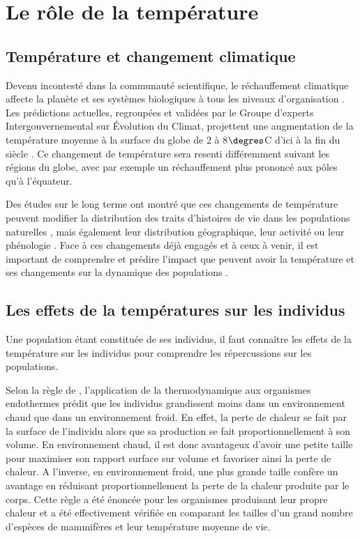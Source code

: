 \section{Le rôle de la température}

\subsection{Température et changement climatique}

Devenu incontesté dans la communauté scientifique, le réchauffement climatique
affecte la planète et ses systèmes biologiques à tous les niveaux
d'organisation \autocites{sagarin1999a,sala2000a,ipcc2007a,walther2002a}. Les
prédictions actuelles, regroupées et validées par le Groupe d’experts
Intergouvernemental sur \'{E}volution du Climat, projettent une augmentation de
la température moyenne à la surface du globe de 2 à 8$\degres$C d'ici à la fin
du siècle \autocites{ipcc2007a}. Ce changement de température sera resenti
différemment suivant les régions du globe, avec par exemple un réchauffement
plus prononcé aux pôles qu'à l'équateur. 

Des études sur le long terme ont montré que ces changements de température
peuvent modifier la distribution des traits d'histoires de vie dans les
populations naturelles \autocites{parmesan2006a,ozgul2009a}, mais également leur
distribution géographique, leur activité ou leur phénologie
\autocites{parmesan2006a,walther2002a}.
Face à ces changements déjà engagés et à ceux à venir, il est important de
comprendre et prédire l'impact que peuvent avoir la température et ses
changements sur la dynamique des populations \autocite{lavergne2010a}. 

\subsection{Les effets de la températures sur les individus}

Une population étant constituée de ses individus, il faut connaître les effets
de la température sur les individus pour comprendre les répercussions sur les
populations. 

Selon la règle de \textcites{bergmann1848a}, l'application de la thermodynamique
aux organismes endothermes prédit que les individus grandissent moins dans un
environnement chaud que dans un environnement froid. En effet, la perte de
chaleur se fait par la surface de l'individu alors que sa production se fait
proportionnellement à son volume. En environnement chaud, il est donc avantageux
d'avoir une petite taille pour maximiser son rapport surface sur volume et
favoriser ainsi la perte de chaleur. A l'inverse, en environnement froid, une
plus grande taille confère un avantage en réduisant proportionnellement la perte
de la chaleur produite par le corps. Cette règle a été énoncée pour les organismes produisant
leur propre chaleur et a été effectivement vérifiée en comparant les tailles
d'un grand nombre d'espèces de mammifères et leur température moyenne de vie. 

